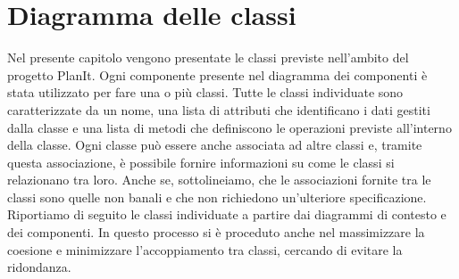 \section{Diagramma delle classi}
\label{secD3:DiagrammaDelleClassi}

Nel presente capitolo vengono presentate le classi previste nell'ambito del progetto PlanIt. Ogni componente presente nel diagramma dei componenti è stata utilizzato per fare una o più classi. Tutte le classi individuate sono caratterizzate da un nome, una lista di attributi che identificano i dati gestiti dalla classe e una lista di metodi che definiscono le operazioni previste all'interno della classe. Ogni classe può essere anche associata ad altre classi e, tramite questa associazione, è possibile fornire informazioni su come le classi si relazionano tra loro. Anche se, sottolineiamo, che le associazioni fornite tra le classi sono quelle non banali e che non richiedono un'ulteriore specificazione.
Riportiamo di seguito le classi individuate a partire dai diagrammi di contesto e dei componenti. In questo processo si è proceduto anche nel massimizzare la coesione e minimizzare l'accoppiamento tra classi, cercando di evitare la ridondanza.

